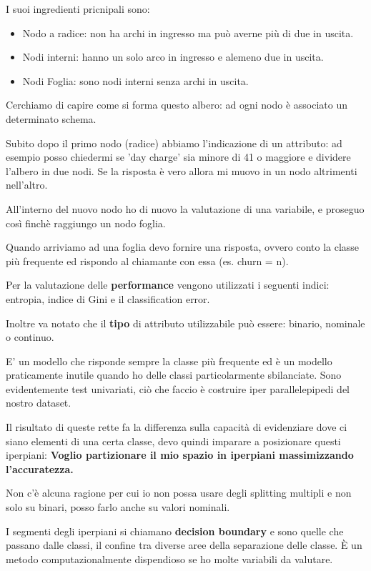 I suoi ingredienti pricnipali sono:
\begin{itemize}
	\item Nodo a radice: non ha archi in ingresso ma può averne più di due in uscita.
	\item Nodi interni: hanno un solo arco in ingresso e alemeno due in uscita.
	\item Nodi Foglia: sono nodi interni senza archi in uscita.
\end{itemize}
Cerchiamo di capire come si forma questo albero: ad ogni nodo è associato un determinato schema.

Subito dopo il primo nodo (radice) abbiamo l'indicazione di un attributo: ad esempio posso chiedermi se 'day charge' sia minore di 41 o maggiore e dividere l'albero in due nodi. Se la risposta è vero allora mi muovo in un nodo altrimenti nell'altro.

All'interno del nuovo nodo ho di nuovo la valutazione di una variabile, e proseguo cos\`i finch\`e raggiungo un nodo foglia.

Quando arriviamo ad una foglia devo fornire una risposta, ovvero conto la classe più frequente ed rispondo al chiamante con essa (es. churn = n).

Per la valutazione delle \textbf{performance} vengono utilizzati i seguenti indici: entropia, indice di Gini e il classification error. 

Inoltre va notato che il \textbf{tipo} di attributo utilizzabile pu\`o essere: binario, nominale o continuo.

E' un modello che risponde sempre la classe più frequente ed è un modello praticamente inutile quando ho delle classi particolarmente sbilanciate. Sono evidentemente test univariati, ciò che faccio è costruire iper parallelepipedi del nostro dataset.

Il risultato di queste rette fa la differenza sulla capacità di evidenziare dove ci siano elementi di una certa classe, devo quindi imparare a posizionare questi iperpiani: \textbf{Voglio partizionare il mio spazio in iperpiani massimizzando l'accuratezza.}

Non c'è alcuna ragione per cui io non possa usare degli splitting multipli e non solo su binari, posso farlo anche su valori nominali.

I segmenti degli iperpiani si chiamano \textbf{decision boundary} e sono quelle che passano dalle classi, il confine tra diverse aree della separazione delle classe. \`E un metodo computazionalmente dispendioso se ho molte variabili da valutare.

